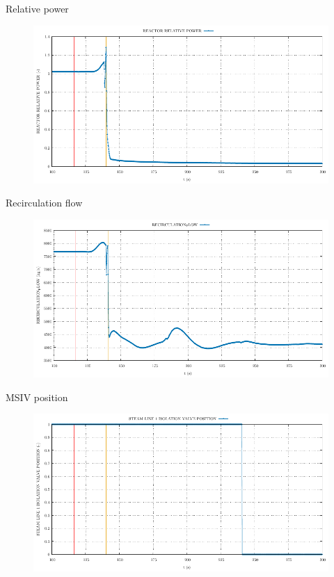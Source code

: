 \begin{frame}{Relative power}
\begin{figure}
	\centering
	\includegraphics[width=\textwidth]{./graphs/REACTOR RELATIVE POWER_comp.pdf}
	
\end{figure}
\end{frame}
\begin{frame}{Recirculation flow}
	\begin{figure}
		\centering
		\includegraphics[width=\textwidth]{./graphs/RECIRCULATION_FLOW_comp.pdf}
		
	\end{figure}

\end{frame}


\begin{frame}{MSIV position}
	\begin{figure}
		\centering
		\includegraphics[width=\textwidth]{./graphs/STEAM LINE 1 ISOLATION VALVE POSITION_comp.pdf}
		
	\end{figure}
	
\end{frame}



